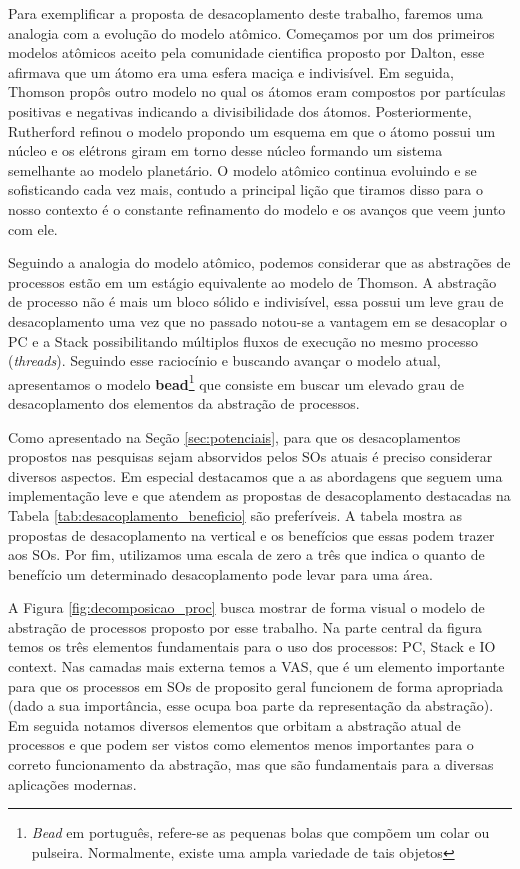Para exemplificar a proposta de desacoplamento deste trabalho, faremos uma
analogia com a evolução do modelo atômico. Começamos por um dos primeiros
modelos atômicos aceito pela comunidade cientifica proposto por Dalton, esse
afirmava que um átomo era uma esfera maciça e indivisível. Em seguida, Thomson
propôs outro modelo no qual os átomos eram compostos por partículas positivas e
negativas indicando a divisibilidade dos átomos.  Posteriormente, Rutherford
refinou o modelo propondo um esquema em que o átomo possui um núcleo e os
elétrons giram em torno desse núcleo formando um sistema semelhante ao modelo
planetário. O modelo atômico continua evoluindo e se sofisticando cada vez
mais, contudo a principal lição que tiramos disso para o nosso contexto é o
constante refinamento do modelo e os avanços que veem junto com ele.

Seguindo a analogia do modelo atômico, podemos considerar que as abstrações de
processos estão em um estágio equivalente ao modelo de Thomson. A abstração de
processo não é mais um bloco sólido e indivisível, essa possui um leve grau de
desacoplamento uma vez que no passado notou-se a vantagem em se desacoplar o PC
e a Stack possibilitando múltiplos fluxos de execução no mesmo processo
(\emph{threads}). Seguindo esse raciocínio e buscando avançar o modelo atual,
apresentamos o modelo \textbf{bead}\footnote{\emph{Bead} em português,
refere-se as pequenas bolas que compõem um colar ou pulseira. Normalmente,
existe uma ampla variedade de tais objetos} que consiste em buscar um elevado
grau de desacoplamento dos elementos da abstração de processos.

Como apresentado na Seção \ref{sec:potenciais}, para que os desacoplamentos
propostos nas pesquisas sejam absorvidos pelos SOs atuais é preciso considerar
diversos aspectos. Em especial destacamos que a as abordagens que seguem uma
implementação leve e que atendem as propostas de desacoplamento destacadas na
Tabela \ref{tab:desacoplamento_beneficio} são preferíveis. A tabela mostra as
propostas de desacoplamento na vertical e os benefícios que essas podem trazer
aos SOs. Por fim, utilizamos uma escala de zero a três  que indica o
quanto de benefício um determinado desacoplamento pode levar para uma área.



A Figura \ref{fig:decomposicao_proc} busca mostrar de forma visual o modelo de
abstração de processos proposto por esse trabalho. Na parte central da figura
temos os três elementos fundamentais para o uso dos processos: PC, Stack e IO
context. Nas camadas mais externa temos a VAS, que é um elemento importante
para que os processos em SOs de proposito geral funcionem de forma apropriada
(dado a sua importância, esse ocupa boa parte da representação da abstração).
Em seguida notamos diversos elementos que orbitam a abstração atual de
processos e que podem ser vistos como elementos menos importantes para o
correto funcionamento da abstração, mas que são fundamentais para a diversas
aplicações modernas.

